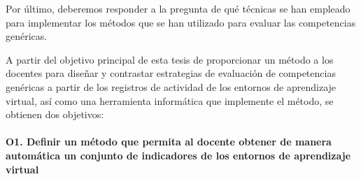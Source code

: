 Por último, deberemos responder a la pregunta de qué técnicas se han empleado para implementar los métodos que se han utilizado para evaluar las competencias genéricas.











A partir del objetivo principal de esta tesis de proporcionar un método a los docentes para diseñar y contrastar estrategias de evaluación de competencias genéricas a partir de los registros de actividad de los entornos de aprendizaje virtual, así como una herramienta informática que implemente el método, se obtienen dos objetivos:
 
\paragraph*{O1. Definir un método que permita al docente obtener de manera automática un conjunto de indicadores de los entornos de aprendizaje virtual}

